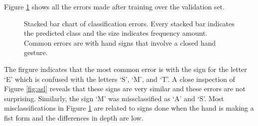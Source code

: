 \documentclass[a4paper]{article}
\begin{document}
Figure \ref{fig:errTargPred} shows all the errors made after training over the
validation set.
\begin{figure}
\centering
{}
\caption{Stacked bar chart of classification errors. Every stacked bar
indicates the predicted class and the size indicates frequency amount. Common
errors are with hand signs that involve a closed hand gesture.}
\label{fig:errTargPred}
\end{figure}
The firgure indicates that the most common error is with the sign for the
letter `E' which is confused with the letters `S', `M', and `T'. A close
inspection of Figure \ref{fig:asl} reveals that these signs are very similar
and these errors are not surprising. Similarly, the sign `M' was missclassified
as `A' and `S'. Most misclassifications in Figure \ref{fig:errTargPred} are
related to signs done when the hand is making a fist form and the differences
in depth are low. 
\end{document}

